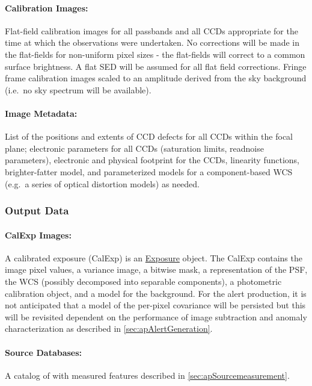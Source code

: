 \paragraph*{Calibration Images:} Flat-field calibration images for all passbands and all CCDs appropriate for the time at which the observations were undertaken. No corrections will be made in the flat-fields for non-uniform pixel sizes - the flat-fields will correct to a common  surface brightness. A flat SED will be assumed for all flat field corrections. Fringe frame calibration images scaled to an amplitude derived from the sky background (i.e.\ no sky spectrum will be available). 

\paragraph*{Image Metadata:} List of the positions and extents of CCD defects for all CCDs within the focal plane; electronic parameters for all CCDs (saturation limits, readnoise parameters), electronic and physical footprint for the CCDs, linearity functions, brighter-fatter model, and parameterized models for a component-based  WCS (e.g.\ a series of optical distortion models) as needed.

\subsubsection{Output Data}
\label{sec:apSFMoutput}

\paragraph*{CalExp Images:} A calibrated exposure (CalExp) is an \hyperref[sec:spImagesExposure]{Exposure} object. The CalExp contains the image pixel values, a variance image, a bitwise mask, a representation of the PSF, the WCS (possibly decomposed into separable components), a photometric calibration object, and a model for the  background. For the alert production, it is not anticipated that a model of the per-pixel covariance will be persisted but this will be revisited dependent on the performance of image subtraction and anomaly characterization as described in \ref{sec:apAlertGeneration}.

\paragraph*{Source Databases:} A catalog of \Sources with measured features described in \ref{sec:apSourcemeasurement}. 

